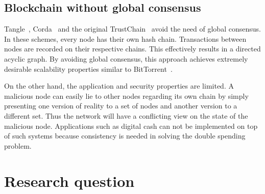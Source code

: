 \subsection{Blockchain without global consensus}

Tangle~\cite{tangle}, Corda~\cite{corda} and the original TrustChain~\cite{multichain} avoid the need of global consensus.
In these schemes, every node has their own hash chain.
Transactions between nodes are recorded on their respective chains.
This effectively results in a directed acyclic graph.
By avoiding global consensus, this approach achieves extremely desirable scalability properties similar to BitTorrent~\cite{cohen2003incentives}.

On the other hand, the application and security properties are limited.
A malicious node can easily lie to other nodes regarding its own chain by simply presenting one version of reality to a set of nodes and another version to a different set.
Thus the network will have a conflicting view on the state of the malicious node.
Applications such as digital cash can not be implemented on top of such systems because consistency is needed in solving the double spending problem.



\section{Research question}
\label{sec:research-question}


